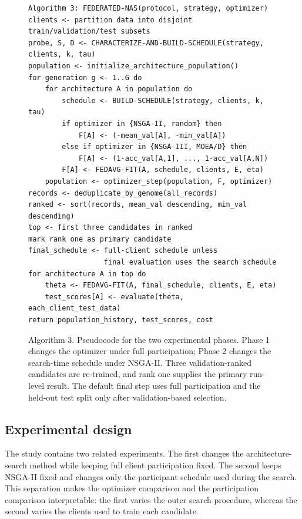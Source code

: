 \documentclass[11pt]{article}
\begin{document}
\begin{figure}[H]
\centering
\begin{minipage}{0.96\linewidth}
\begin{verbatim}
Algorithm 3: FEDERATED-NAS(protocol, strategy, optimizer)
clients <- partition data into disjoint train/validation/test subsets
probe, S, D <- CHARACTERIZE-AND-BUILD-SCHEDULE(strategy, clients, k, tau)
population <- initialize_architecture_population()
for generation g <- 1..G do
    for architecture A in population do
        schedule <- BUILD-SCHEDULE(strategy, clients, k, tau)
        if optimizer in {NSGA-II, random} then
            F[A] <- (-mean_val[A], -min_val[A])
        else if optimizer in {NSGA-III, MOEA/D} then
            F[A] <- (1-acc_val[A,1], ..., 1-acc_val[A,N])
        F[A] <- FEDAVG-FIT(A, schedule, clients, E, eta)
    population <- optimizer_step(population, F, optimizer)
records <- deduplicate_by_genome(all_records)
ranked <- sort(records, mean_val descending, min_val descending)
top <- first three candidates in ranked
mark rank one as primary candidate
final_schedule <- full-client schedule unless
                  final evaluation uses the search schedule
for architecture A in top do
    theta <- FEDAVG-FIT(A, final_schedule, clients, E, eta)
    test_scores[A] <- evaluate(theta, each_client_test_data)
return population_history, test_scores, cost
\end{verbatim}
\end{minipage}
\caption{Algorithm 3. Pseudocode for the two experimental phases. Phase 1 changes the optimizer under full participation; Phase 2 changes the search-time schedule under NSGA-II. Three validation-ranked candidates are re-trained, and rank one supplies the primary run-level result. The default final step uses full participation and the held-out test split only after validation-based selection.}
\label{alg:nas}
\end{figure}

\subsection{Experimental design}

The study contains two related experiments. The first changes the architecture-search method while keeping full client participation fixed. The second keeps NSGA-II fixed and changes only the participant schedule used during the search. This separation makes the optimizer comparison and the participation comparison interpretable: the first varies the outer search procedure, whereas the second varies the clients used to train each candidate.
\end{document}
